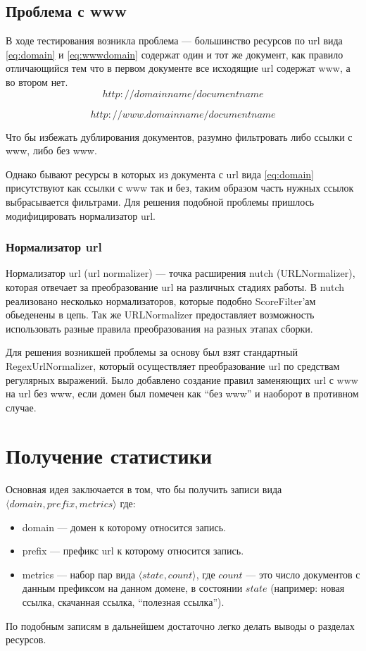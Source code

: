 \subsection*{Проблема с www}
В ходе тестирования возникла проблема --- большинство ресурсов по url вида \ref{eq:domain} и \ref{eq:wwwdomain} содержат один и тот же документ, как правило отличающийся тем что в первом документе все исходящие url содержат www, а во втором нет.
\begin{equation} \label{eq:domain}
 http://domainname/documentname
\end{equation}

\begin{equation} \label{eq:wwwdomain}
 http://www.domainname/documentname
\end{equation}


Что бы избежать дублирования документов, разумно фильтровать либо ссылки с www, либо без www.

Однако бывают ресурсы в которых из документа с url вида \ref{eq:domain} присутствуют как ссылки с www так и без, таким образом часть нужных ссылок выбрасывается фильтрами. Для решения подобной проблемы пришлось модифицировать нормализатор url.
\subsubsection*{Нормализатор url}
Нормализатор url (url normalizer) --- точка расширения nutch (URLNormalizer), которая отвечает за преобразование url на различных стадиях работы. В nutch реализовано несколько нормализаторов, которые подобно ScoreFilter'ам обьеденены в цепь. Так же URLNormalizer предоставляет возможность использовать разные правила преобразования на разных этапах сборки.

Для решения возникшей проблемы за основу был взят стандартный RegexUrlNormalizer, который осуществляет преобразование url по средствам регулярных выражений. Было добавлено создание правил заменяющих url с www на url без www, если домен был помечен как ``без www'' и наоборот в противном случае.

\section*{Получение статистики}
Основная идея заключается в том, что бы получить записи вида $\langle domain,prefix,metrics \rangle$ где:
\begin{itemize}
 \item domain --- домен к которому относится запись.
 \item prefix --- префикс url к которому относится запись.
 \item metrics --- набор пар вида $\langle state, count\rangle$, где $count$ --- это число документов с данным префиксом на данном домене, в состоянии $state$ (например: новая ссылка, скачанная ссылка, ``полезная ссылка'').
\end{itemize}
По подобным записям в дальнейшем достаточно легко делать выводы о разделах ресурсов.

